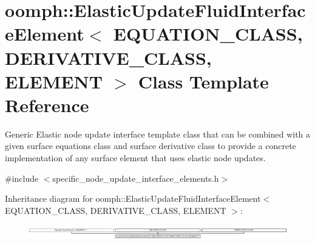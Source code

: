 \hypertarget{classoomph_1_1ElasticUpdateFluidInterfaceElement}{}\section{oomph\+:\+:Elastic\+Update\+Fluid\+Interface\+Element$<$ E\+Q\+U\+A\+T\+I\+O\+N\+\_\+\+C\+L\+A\+SS, D\+E\+R\+I\+V\+A\+T\+I\+V\+E\+\_\+\+C\+L\+A\+SS, E\+L\+E\+M\+E\+NT $>$ Class Template Reference}
\label{classoomph_1_1ElasticUpdateFluidInterfaceElement}


Generic Elastic node update interface template class that can be combined with a given surface equations class and surface derivative class to provide a concrete implementation of any surface element that uses elastic node updates.  




{\ttfamily \#include $<$specific\+\_\+node\+\_\+update\+\_\+interface\+\_\+elements.\+h$>$}

Inheritance diagram for oomph\+:\+:Elastic\+Update\+Fluid\+Interface\+Element$<$ E\+Q\+U\+A\+T\+I\+O\+N\+\_\+\+C\+L\+A\+SS, D\+E\+R\+I\+V\+A\+T\+I\+V\+E\+\_\+\+C\+L\+A\+SS, E\+L\+E\+M\+E\+NT $>$\+:\begin{figure}[H]
\begin{center}
\leavevmode
\includegraphics[height=0.628507cm]{classoomph_1_1ElasticUpdateFluidInterfaceElement}
\end{center}
\end{figure}
